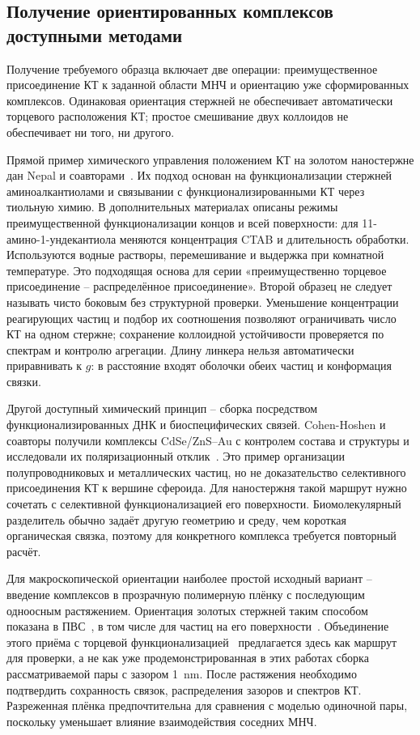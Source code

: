 \subsection{Получение ориентированных комплексов доступными методами}
\label{sec:experiment-assembly}

Получение требуемого образца включает две операции: преимущественное
присоединение КТ к заданной области МНЧ и ориентацию уже сформированных
комплексов. Одинаковая ориентация стержней не обеспечивает автоматически
торцевого расположения КТ; простое смешивание двух коллоидов не обеспечивает
ни того, ни другого.

Прямой пример химического управления положением КТ на золотом наностержне
дан Nepal и соавторами~\cite{nepal2013}. Их подход основан
на функционализации стержней аминоалкантиолами и связывании
с функционализированными КТ через тиольную химию. В дополнительных
материалах описаны режимы преимущественной функционализации концов
и всей поверхности: для 11-амино-1-ундекантиола меняются концентрация
CTAB и длительность обработки. Используются водные растворы,
перемешивание и выдержка при комнатной температуре. Это подходящая
основа для серии «преимущественно торцевое присоединение -- распределённое
присоединение». Второй образец не следует называть чисто боковым без
структурной проверки. Уменьшение концентрации реагирующих частиц
и подбор их соотношения позволяют ограничивать число КТ на одном
стержне; сохранение коллоидной устойчивости проверяется по спектрам
и контролю агрегации. Длину линкера нельзя автоматически приравнивать
к $g$: в расстояние входят оболочки обеих частиц и конформация связки.

Другой доступный химический принцип -- сборка посредством
функционализированных ДНК и биоспецифических связей. Cohen-Hoshen
и соавторы получили комплексы CdSe/ZnS--Au с контролем состава
и структуры и исследовали их поляризационный отклик~\cite{cohenhoshen2012}.
Это пример организации полупроводниковых и металлических частиц,
но не доказательство селективного присоединения КТ к вершине сфероида.
Для наностержня такой маршрут нужно сочетать с селективной
функционализацией его поверхности. Биомолекулярный разделитель обычно
задаёт другую геометрию и среду, чем короткая органическая связка,
поэтому для конкретного комплекса требуется повторный расчёт.

Для макроскопической ориентации наиболее простой исходный вариант --
введение комплексов в прозрачную полимерную плёнку с последующим
одноосным растяжением. Ориентация золотых стержней таким способом
показана в ПВС~\cite{vanderzande1999}, в том числе для частиц на его
поверхности~\cite{murphy2005}. Объединение этого приёма с торцевой
функционализацией~\cite{nepal2013} предлагается здесь как маршрут
для проверки, а не как уже продемонстрированная в этих работах
сборка рассматриваемой пары с зазором \SI{1}{\nano\meter}.
После растяжения необходимо подтвердить сохранность связок,
распределения зазоров и спектров КТ. Разреженная плёнка предпочтительна
для сравнения с моделью одиночной пары, поскольку уменьшает влияние
взаимодействия соседних МНЧ.

